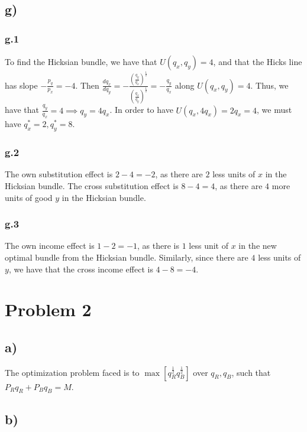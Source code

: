 \documentclass[12pt,letterpaper]{article}
\theoremstyle{definition}
\begin{document}
\subsection*{g)}

\subsubsection*{g.1}

To find the Hicksian bundle, we have that $U(q_x,q_y) = 4$, and that the Hicks line
has slope $-\frac{p_q}{p_x} = -4$. Then $\frac{dq_x}{dq_y} =
-\frac{(\frac{q_y}{q_x})^{\frac{1}{2}}}{(\frac{q_x}{q_y})^{\frac{1}{2}}} = -\frac{q_y}{q_x}$
along $U(q_x,q_y) = 4$. Thus, we have that $\frac{q_y}{q_x} = 4 \implies q_y= 4q_x$. In
order to have $U(q_x,4q_x) = 2q_x = 4$, we must have $q_x^* = 2, q_y^* = 8$. 

\subsubsection*{g.2}

The own substitution effect is $2-4 = -2$, as there are $2$ less units of $x$ in
the Hicksian bundle. The cross substitution effect is $8-4=4$, as there are $4$
more units of good $y$ in the Hicksian bundle.

\subsubsection*{g.3}

The own income effect is $1-2=-1$, as there is $1$ less unit of $x$ in the new
optimal bundle from the Hicksian bundle. Similarly, since there are $4$ less
units of $y$, we have that the cross income effect is $4-8 = -4$.

\section*{Problem 2}

\subsection*{a)}

The optimization problem faced is to $\max[q_R^{\frac{1}{2}}q_B^{\frac{1}{2}}]$ over
$q_R,q_B$, such that $P_Rq_R + P_Bq_B = M$.

\subsection*{b)}
\end{document}
